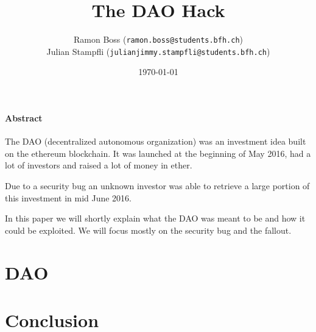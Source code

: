 \documentclass[a4paper, 11pt]{scrartcl}
\begin{document}
\title{The DAO Hack}
\date{\today}   %
\author{
  Ramon Boss (\texttt{ramon.boss@students.bfh.ch}) \\
  Julian Stampfli (\texttt{julianjimmy.stampfli@students.bfh.ch}) 
}
 
\maketitle

\paragraph{Abstract}
The DAO (decentralized autonomous organization) was an investment idea built on the ethereum blockchain. It was launched at the beginning of May 2016, had a lot of investors and raised a lot of money in ether. 

Due to a security bug an unknown investor was able to retrieve a large portion of this investment in mid June 2016. 

In this paper we will shortly explain what the DAO was meant to be and how it could be exploited. We will focus mostly on the security bug and the fallout.

\setcounter{tocdepth}{2}
\tableofcontents
\clearpage

\section{DAO}

\section{Conclusion}

\nocite{*}
\clearpage
\printbibliography[heading=bibintoc]
\end{document}
